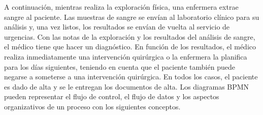 A continuación, mientras realiza la exploración física, una enfermera extrae sangre al paciente. Las muestras de sangre se envían al laboratorio clínico para su análisis y, una vez listos, los resultados se envían de vuelta al servicio de urgencias. Con las notas de la exploración y los resultados del análisis de sangre, el médico tiene que hacer un diagnóstico. En función de los resultados, el médico realiza inmediatamente una intervención quirúrgica o la enfermera la planifica para los días siguientes, teniendo en cuenta que el paciente también puede negarse a someterse a una intervención quirúrgica. En todos los casos, el paciente es dado de alta y se le entregan los documentos de alta. Los diagramas BPMN pueden representar el flujo de control, el flujo de datos y los aspectos organizativos de un proceso con los siguientes conceptos.

